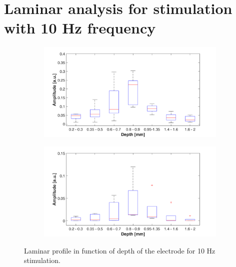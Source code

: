 \documentclass{pracalicmgr}
\begin{document}
\section{Laminar analysis for stimulation with 10 Hz frequency}  
   	\begin{figure}[H]
	\begin{subfigure}{.5\textwidth}
		\centering
		\includegraphics[width=1.\linewidth]{profile_10Hz_wid.png}
		\caption{}
		\label{rys:profil_10Hz_wid1}
	\end{subfigure}%
	\begin{subfigure}{.5\textwidth}
		\centering
		\includegraphics[width=1.\linewidth]{profile_10Hz_wid2.png}
		\caption{}
		\label{rys:profil_10Hz_wid2}
	\end{subfigure}
	
	\caption{Laminar profile in function of depth of the electrode for 10 Hz stimulation.}
	\label{rys:profil_10Hz_wid}
\end{figure}
\end{document}
